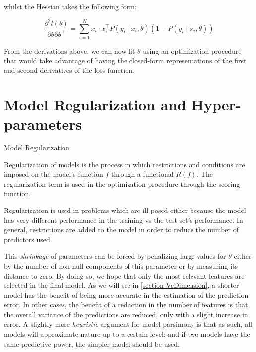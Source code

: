 whilst the Hessian takes the following form:

\begin{equation}\label{eq:logitHessian2}
\frac{\partial^2 l(\theta)}{\partial \theta \partial \theta^\intercal} = \sum_{i=1}^N x_i \cdot x_i^\intercal P(y_i \mid x_i,\theta)(1 -P(y_i \mid x_i,\theta))
\end{equation}

From the derivations above, we can now fit $\theta$ using an optimization procedure that would take advantage of having the closed-form representations of the first and second derivatives of the loss function.


\section{Model Regularization and Hyper-parameters}\label{section-hyperParametersRegularization}


\begin{definition}{Model Regularization}

Regularization of models is the process in which restrictions and conditions are imposed on the model's function $f$ through a functional $ R(f)$. The regularization term is used in the optimization procedure through the scoring function.

\end{definition}

Regularization is used in problems which are ill-posed either because the model has very different performance in the training vs the test set's performance. In general, restrictions are added to the model in order to reduce the number of predictors used.

This \textit{shrinkage} of parameters can be forced by penalizing large values for $\theta$ either by the number of non-null components of this parameter or by measuring its distance to zero. By doing so, we hope that only the most relevant features are selected in the final model. As we will see in \cref{section-VcDimension}, a shorter model has the benefit of being more accurate in the estimation of the prediction error. In other cases, the benefit of a reduction in the number of features is that the overall variance of the predictions are reduced, only with a slight increase in error. A slightly more \textit{heuristic} argument for model parsimony is that as such, all models will approximate nature up to a certain level; and if two models have the same predictive power, the simpler model should be used.


